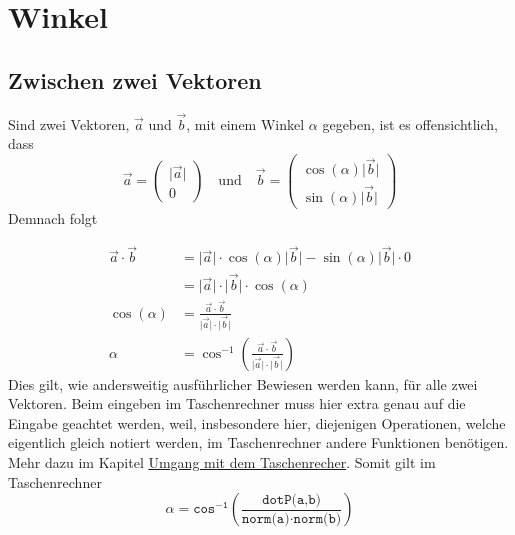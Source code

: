 \documentclass{article}
\begin{document}
   
\newcommand{\norm}[1]{\big| {#1} \big|}  
\newcommand{\vect}[1]{\overrightarrow{#1}} 
 
\section{Winkel}
\subsection{Zwischen zwei Vektoren} 
\begin{minipage}[t]{\dimexpr\textwidth-4cm} 
Sind zwei Vektoren, $\vect{a}$ und $\vect{b}$, mit einem Winkel $\alpha$ gegeben, ist es offensichtlich, dass
\[
 \vect{a} = \begin{pmatrix} \norm{\vect{a}} \\ 0 \end{pmatrix}
 \quad \text{und} \quad 
 \vect{b} = \begin{pmatrix} \cos(\alpha) \norm{\vect{b}} \\ \sin(\alpha) \norm{\vect{b}} \end{pmatrix}
\]
Demnach folgt
\end{minipage} 
\hfill
\begin{minipage}[t]{4cm} 
 \centering 
\end{minipage}
\begin{align*}
 \vect{a} \cdot \vect{b} &= \norm{\vect{a}} \cdot \cos(\alpha) \norm{\vect{b}} - \sin(\alpha) \norm{\vect{b}} \cdot 0 \\
 &= \norm{\vect{a}} \cdot \norm{\vect{b}} \cdot \cos(\alpha) \\
 \cos(\alpha) &= \frac{\vect{a} \cdot \vect{b}}{\norm{\vect{a}} \cdot  
\norm{\vect{b}}} \\ 
 \alpha &= \cos^{-1}\left({\frac{\vect{a} \cdot \vect{b}}{\norm{\vect{a}} \cdot  \norm{\vect{b}}}}\right)
\end{align*}
Dies gilt, wie andersweitig ausführlicher Bewiesen werden kann, für alle zwei Vektoren.
 Beim eingeben im Taschenrechner muss hier extra genau auf die Eingabe geachtet werden, weil, insbesondere hier, diejenigen Operationen, welche eigentlich gleich notiert werden, im Taschenrechner andere Funktionen benötigen. Mehr dazu im Kapitel \hyperref[Umgang mit dem Taschenrecher]{Umgang mit dem Taschenrecher}. Somit gilt im Taschenrechner
\[ 
 \alpha =
 \texttt{cos}^{-\texttt{1}}\left(
 \frac{\texttt{dotP(a,b)}}{\texttt{norm(a)}\cdot\texttt{norm(b)}}
 \right) 
\] 
  
\end{document}
